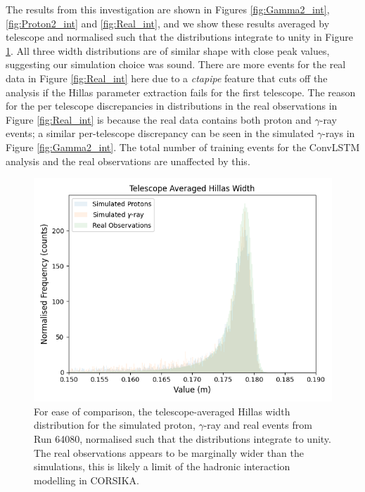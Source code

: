 The results from this investigation are shown in Figures \ref{fig:Gamma2_int}, \ref{fig:Proton2_int} and \ref{fig:Real_int}, and we show these results averaged by telescope and normalised such that the distributions integrate to unity in Figure \ref{fig:telaveragedwidth}. All three width distributions are of similar shape with close peak values, suggesting our simulation choice was sound. There are more events for the real data in Figure \ref{fig:Real_int} here due to a \textit{ctapipe} feature that cuts off the analysis if the Hillas parameter extraction fails for the first telescope. The reason for the per telescope discrepancies in distributions in the real observations in Figure \ref{fig:Real_int} is because the real data contains both proton and $\gamma$-ray events; a similar per-telescope discrepancy can be seen in the simulated $\gamma$-rays in Figure \ref{fig:Gamma2_int}. The total number of training events for the ConvLSTM analysis and the real observations are unaffected by this.
\begin{figure}[ht] 
        \centering \includegraphics[width=\columnwidth]{figures/telaveragedwidth.png}

        \caption{
                \label{fig:telaveragedwidth} For ease of comparison, the telescope-averaged Hillas width distribution for the simulated proton, $\gamma$-ray and real events from Run 64080, normalised such that the distributions integrate to unity. The real observations appears to be marginally wider than the simulations, this is likely a limit of the hadronic interaction modelling in CORSIKA.
        }
\end{figure}
